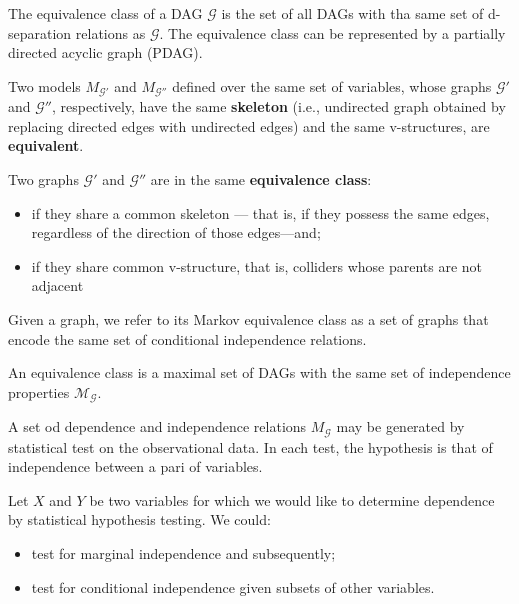The equivalence class of a DAG $\mathcal{G}$ is the set of all DAGs with tha same
set of d-separation relations as $\mathcal{G}$. The equivalence class can be represented
by a partially directed acyclic graph (PDAG).

\begin{definition}
    Two models $M_\mathcal{G'}$ and $M_\mathcal{G''}$ defined over the same set
    of variables, whose graphs $\mathcal{G'}$ and $\mathcal{G''}$, respectively,
    have the same \textbf{skeleton} (i.e., undirected graph obtained by replacing
    directed edges with undirected edges) and the same v-structures, are \textbf{equivalent}.

    Two graphs $\mathcal{G'}$ and $\mathcal{G''}$ are in the same \textbf{equivalence class}:
    \begin{itemize}
        \item if they share a common skeleton — that is, if they possess the same
              edges, regardless of the direction of those edges—and;
        \item if they share common v-structure, that is, colliders whose parents
              are not adjacent
    \end{itemize}
\end{definition}

Given a graph, we refer to its Markov equivalence class as a set of graphs that
encode the same set of conditional independence relations.

\begin{definition}
    An equivalence class is a maximal set of DAGs with the same set of independence
    properties $\mathcal{M}_{\mathcal{G}}$.
\end{definition}

A set od dependence and independence relations $M_{\mathcal{G}}$ may be generated
by statistical test on the observational data. In each test, the hypothesis is
that of independence between a pari of variables.

Let $X$ and $Y$ be two variables for which we would like to determine dependence
by statistical hypothesis testing. We could:
\begin{itemize}
    \item test for marginal independence and subsequently;
    \item test for conditional independence given subsets of other variables.
\end{itemize}
